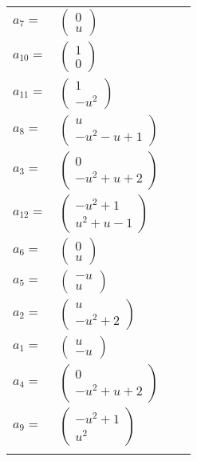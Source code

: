 \documentclass[1p]{elsarticle_modified}
\theoremstyle{definition}
\begin{document}
\begin{tabular}{m{7pt} m{180pt} m{7pt} m{180pt} }
\flushright $a_{7}=$&$\begin{pmatrix}0\\u\end{pmatrix}$ \\
\flushright $a_{10}=$&$\begin{pmatrix}1\\0\end{pmatrix}$ \\
\flushright $a_{11}=$&$\begin{pmatrix}1\\- u^2\end{pmatrix}$ \\
\flushright $a_{8}=$&$\begin{pmatrix}u\\- u^2- u+1\end{pmatrix}$ \\
\flushright $a_{3}=$&$\begin{pmatrix}0\\- u^2+u+2\end{pmatrix}$ \\
\flushright $a_{12}=$&$\begin{pmatrix}- u^2+1\\u^2+u-1\end{pmatrix}$ \\
\flushright $a_{6}=$&$\begin{pmatrix}0\\u\end{pmatrix}$ \\
\flushright $a_{5}=$&$\begin{pmatrix}- u\\u\end{pmatrix}$ \\
\flushright $a_{2}=$&$\begin{pmatrix}u\\- u^2+2\end{pmatrix}$ \\
\flushright $a_{1}=$&$\begin{pmatrix}u\\- u\end{pmatrix}$ \\
\flushright $a_{4}=$&$\begin{pmatrix}0\\- u^2+u+2\end{pmatrix}$ \\
\flushright $a_{9}=$&$\begin{pmatrix}- u^2+1\\u^2\end{pmatrix}$\\&\end{tabular}
\end{document}
